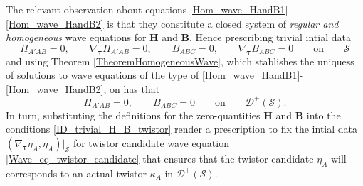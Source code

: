 \documentclass[10pt,a4paper]{article}
\theoremstyle{plain}
\def\bmB{{\bm B}}
\def\bmH{{\bm H}}
\begin{document}
The relevant observation about equations
\eqref{Hom_wave_HandB1}-\eqref{Hom_wave_HandB2} is that they
constitute a closed system of \emph{regular and homogeneous}
wave equations for $\bmH$ and $\bmB$.
Hence prescribing trivial intial data
\[
H_{A'AB}=0, \qquad \nabla_{\bm\tau} H_{A'AB}=0, \qquad B_{ABC}=0, \qquad \nabla_{\bm\tau} B_{ABC}=0 \qquad \text{on} \qquad \mathcal{S}
\]
and using Theorem \ref{TheoremHomogeneousWave}, which stablishes the
uniquess of solutions to wave equations of the type
of \eqref{Hom_wave_HandB1}-\eqref{Hom_wave_HandB2}, on has that 
\begin{equation}\label{ID_trivial_H_B_twistor}
H_{A'AB}=0, \qquad B_{ABC}=0 \qquad \text{on} \qquad \mathcal{D}^{+}(\mathcal{S}) .
\end{equation}
In turn, substituting the definitions for the zero-quantities $\bmH$
and $\bmB$ into the conditions \eqref{ID_trivial_H_B_twistor} render a
prescription to fix the intial data $(\nabla_{\bm\tau} \eta_A,
\eta_A)|_\mathcal{S}$ for  twistor
candidate wave equation \eqref{Wave_eq_twistor_candidate} that ensures that
 the twistor candidate $\eta_A$ will
corresponds to an actual twistor $\kappa_A$ in $\mathcal{D}^{+}(\mathcal{S})$.
\end{document}
